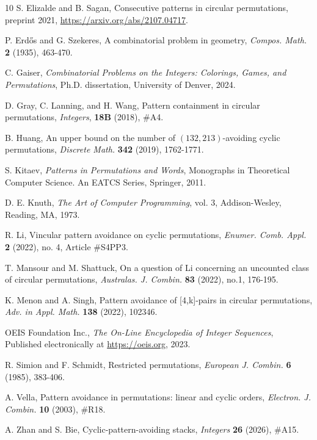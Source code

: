 \documentclass[11pt]{article}
\theoremstyle{definition}
\numberwithin{equation}{section}
\begin{document}
\begin{thebibliography}{10}
 S. Elizalde and B. Sagan, Consecutive patterns in circular permutations, preprint 2021, \url{https://arxiv.org/abs/2107.04717}.

 P. Erd\H{o}s and G. Szekeres, A combinatorial problem in geometry, \textit{Compos. Math.} \textbf{2} (1935), 463-470.

 C. Gaiser, \textit{Combinatorial Problems on the Integers: Colorings, Games, and Permutations}, Ph.D. dissertation, University of Denver, 2024.

 D. Gray, C. Lanning, and H. Wang, Pattern containment in circular permutations, \textit{Integers}, \textbf{18B} (2018), \#A4.

 B. Huang, An upper bound on the number of $(132,213)$-avoiding cyclic permutations, \textit{Discrete Math.} \textbf{342} (2019), 1762-1771.

 S. Kitaev, \textit{Patterns in Permutations and Words}, Monographs in Theoretical Computer Science. An EATCS Series, Springer, 2011.

 D. E. Knuth, \textit{The Art of Computer Programming}, vol. 3, Addison-Wesley, Reading, MA, 1973.

 R. Li, Vincular pattern avoidance on cyclic permutations, \textit{Enumer. Comb. Appl.} \textbf{2} (2022), no. 4, Article \#S4PP3.

 T. Mansour and M. Shattuck, On a question of Li concerning an uncounted class of circular permutations, \textit{Australas. J. Combin.} \textbf{83} (2022), no.1, 176-195.

 K. Menon and A. Singh, Pattern avoidance of [4,k]-pairs in circular permutations, \textit{Adv. in Appl. Math.} \textbf{138} (2022), 102346.

 OEIS Foundation Inc., \textit{The On-Line Encyclopedia of Integer Sequences}, Published electronically at \url{https://oeis.org}, 2023.

 R. Simion and F. Schmidt, Restricted permutations, \textit{European J. Combin.} \textbf{6} (1985), 383-406.

 A. Vella, Pattern avoidance in permutations: linear and cyclic orders, \textit{Electron. J. Combin.} \textbf{10} (2003), \#R18.

 A. Zhan and S. Bie, Cyclic-pattern-avoiding stacks, \textit{Integers} \textbf{26} (2026), \#A15.

\end{thebibliography}
\end{document}

